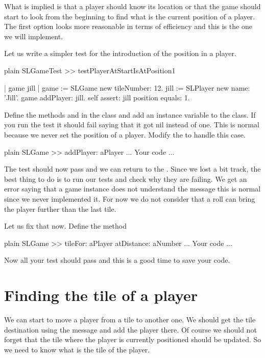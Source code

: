 \documentclass[10pt,twoside,english]{_support/latex/sbabook/sbabook}
\begin{document}
What is implied is that a player should know its location or that the game should start to look from the beginning to find what is the current position of a player. 
The first option looks more reasonable in terms of efficiency and this is the one we will implement. 

Let us write a simpler test for the introduction of the position in a player. 

\begin{displaycode}{plain}
SLGameTest >> testPlayerAtStartIsAtPosition1

	| game jill |
	game := SLGame new tileNumber: 12.
	jill := SLPlayer new name: 'Jill'.
	game addPlayer: jill.
	self assert: jill position equals: 1.
\end{displaycode}

Define the methods  and  in the class  and add an instance
variable  to the class. If you run the test it should fail saying that it got nil instead of one. This is normal because we never set the position of a player.
Modify the  to handle this case. 

\begin{displaycode}{plain}
SLGame >> addPlayer: aPlayer
	... Your code ...
\end{displaycode}

The test  should now pass and we can return to the . Since we lost a bit track, the best thing to do is to run our tests and check why they are failing. 
We get an error saying that a game instance does not understand the message  this is normal since we never implemented it.
For now we do not consider that a roll can bring the player further than the last tile.

Let us fix that now. Define the method 

\begin{displaycode}{plain}
SLGame >> tileFor: aPlayer atDistance: aNumber
	... Your code ...
\end{displaycode}

Now all your test should pass and this is a good time to save your code.
\section{Finding the tile of a player}
We can start to move a player from a tile to another one. 
We should get the tile destination using the message  and add the player there. Of course we should not forget that the tile where the player is currently positioned should be updated. So we need to know what is the tile of the player.
\end{document}
